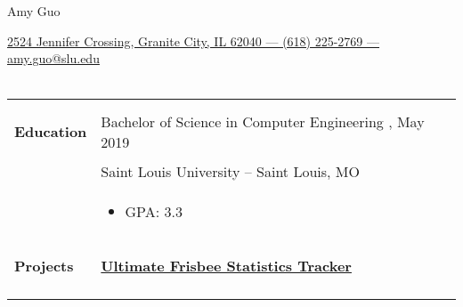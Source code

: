 \documentclass[11pt]{article}
\makeatletter
\newcommand{\fullname}{Amy Guo }
\newcommand{\homeaddress}{2524 Jennifer Crossing, Granite City, IL 62040 }
\newcommand{\phone}{(618) 225-2769 }
\newcommand{\emailaddress}{amy.guo@slu.edu }
\newcommand{\degree}{Bachelor of Science in Computer Engineering }
\newcommand{\graddate}{May 2019 }
\newcommand{\university}{Saint Louis University -- Saint Louis, MO }
\newcommand{\gpa}{3.3}
\makeatother
\begin{document}
	\thispagestyle{empty}
	\noindent\begin{center}\huge{\fullname}\end{center}
	\noindent\uline{\hfill \homeaddress --- \phone --- \emailaddress \hfill} \\\\
	\begin{tabularx}{\textwidth}{|l|X|}
		\hline & \\
		\begin{large}\textbf{Education}\end{large} & \degree, \graddate \\ 
		& \university \\
		& \vspace{-\topsep} \begin{itemize}[noitemsep, nolistsep] \item GPA: \gpa \end{itemize}\\
		\begin{large}\textbf{Projects}\end{large} & \uline{\textbf{Ultimate Frisbee Statistics Tracker} \hfill} \\
		& \vspace{-\topsep} 
		\begin{itemize}[noitemsep, topsep=0pt]


\end{itemize}
\end{tabularx}
\end{document}

